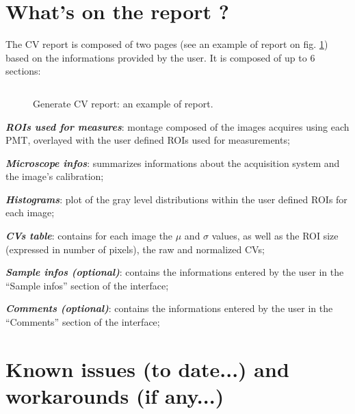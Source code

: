 \documentclass[a4paper, 11pt]{report}%
\begin{document}
\section{What's on the report ?}
\label{sec:gcvr-rep}

The CV report is composed of two pages (see an example of report on fig. \ref{fig:gcvr-report}) based on the informations provided by the user. It is composed of up to 6 sections:
\begin{figure}[!ht]
		\begin{center}
		\begin{tabular}{c}
		\end{tabular}
	\end{center}
	\caption{\label{fig:gcvr-report}Generate CV report: an example of report.}
\end{figure} 
\begin{itemize*}
	\item \textbf{\textit{ROIs used for measures}}: montage composed of the images acquires using each PMT, overlayed with the user defined ROIs used for measurements;
	\item \textbf{\textit{Microscope infos}}: summarizes informations about the acquisition system and the image's calibration;
	\item \textbf{\textit{Histograms}}: plot of the gray level distributions within the user defined ROIs for each image;
	\item \textbf{\textit{CVs table}}: contains for each image the $\mu$ and $\sigma$ values, as well as the ROI size (expressed in number of pixels), the raw and normalized CVs;
	\item \textbf{\textit{Sample infos (optional)}}: contains the informations entered by the user in the ``Sample infos'' section of the interface;
	\item \textbf{\textit{Comments (optional)}}: contains the informations entered by the user in the ``Comments'' section of the interface;
\end{itemize*}

\section{Known issues (to date...) and workarounds (if any...)}
\label{sec:gcvr-ki}
\end{document}
